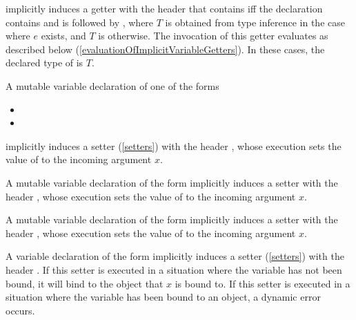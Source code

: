 \documentclass[makeidx]{article}
\begin{document}
\noindent
implicitly induces a getter with the header that
contains \STATIC{} if{}f the declaration contains \STATIC{} and is followed by
,
where $T$ is obtained from type inference
in the case where $e$ exists,
and $T$ is \DYNAMIC{} otherwise.
The invocation of this getter evaluates as described below
(\ref{evaluationOfImplicitVariableGetters}).
In these cases, the declared type of \id{} is $T$.
\EndCase

\LMHash{}%
A mutable variable declaration of one of the forms

\begin{itemize}
\item {}
\item {}
\end{itemize}

\noindent
implicitly induces a setter (\ref{setters}) with the header
,
whose execution sets the value of \id{} to the incoming argument $x$.

\LMHash{}%
A mutable variable declaration of the form
implicitly induces a setter with the header
,
whose execution sets the value of \id{} to the incoming argument $x$.

\EndCase

\LMHash{}%
A mutable variable declaration of the form
implicitly induces a setter with the header
,
whose execution sets the value of \id{} to the incoming argument $x$.

\EndCase

\LMHash{}%
A variable declaration of the form
implicitly induces a setter (\ref{setters}) with the header
.
If this setter is executed
in a situation where the variable \id{} has not been bound,
it will bind \id{} to the object that $x$ is bound to.
If this setter is executed
in a situation where the variable \id{} has been bound to an object,
a dynamic error occurs.
\EndCase
\end{document}
